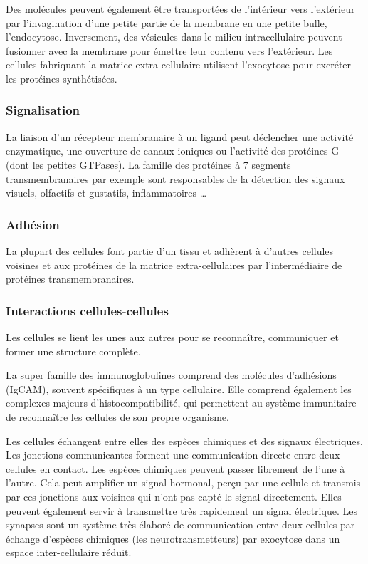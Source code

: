 \documentclass{report}
\begin{document}
Des molécules peuvent également être transportées de l'intérieur vers l'extérieur par l'invagination d'une petite partie de la membrane en une petite bulle, l'endocytose. Inversement, des vésicules dans le milieu intracellulaire peuvent fusionner avec la membrane pour émettre leur contenu vers l'extérieur. Les cellules fabriquant la matrice extra-cellulaire utilisent l'exocytose pour excréter les protéines synthétisées. 

\subsubsection{Signalisation}

La liaison d'un récepteur membranaire à un ligand peut déclencher une activité enzymatique, une ouverture de canaux ioniques ou l'activité des protéines G (dont les petites GTPases). 
La famille des protéines à 7 segments transmembranaires par exemple sont responsables de la détection des signaux visuels, olfactifs et gustatifs, inflammatoires \dots

\subsubsection{Adhésion}

La plupart des cellules font partie d'un tissu et adhèrent à d'autres cellules voisines et aux protéines de la matrice extra-cellulaires par l'intermédiaire de protéines transmembranaires. 

\subsubsection{Interactions cellules-cellules}

Les cellules se lient les unes aux autres pour se reconnaître, communiquer et former une structure complète. 

La super famille des immunoglobulines comprend des molécules d'adhésions (IgCAM), souvent spécifiques à un type cellulaire. Elle comprend également les complexes majeurs d'histocompatibilité, qui permettent au système immunitaire de reconnaître les cellules de son propre organisme. 

Les cellules échangent entre elles des espèces chimiques et des signaux électriques. 
Les jonctions communicantes forment une communication directe entre deux cellules en contact. Les espèces chimiques peuvent passer librement de l'une à l'autre. Cela peut amplifier un signal hormonal, perçu par une cellule et transmis par ces jonctions aux voisines qui n'ont pas capté le signal directement. Elles peuvent également servir à transmettre très rapidement un signal électrique. 
Les synapses sont un système très élaboré de communication entre deux cellules par échange d'espèces chimiques (les neurotransmetteurs) par exocytose dans un espace inter-cellulaire réduit. 
\end{document}
